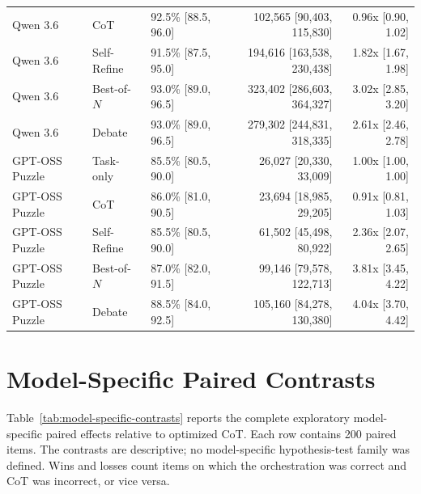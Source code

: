 \begin{table}[H]
{\begin{tabular}{@{}lllrr@{}}
Qwen 3.6 & CoT & 92.5\% [88.5, 96.0] & 102,565 [90,403, 115,830] & 0.96x [0.90, 1.02] \\
Qwen 3.6 & Self-Refine & 91.5\% [87.5, 95.0] & 194,616 [163,538, 230,438] & 1.82x [1.67, 1.98] \\
Qwen 3.6 & Best-of-$N$ & 93.0\% [89.0, 96.5] & 323,402 [286,603, 364,327] & 3.02x [2.85, 3.20] \\
Qwen 3.6 & Debate & 93.0\% [89.0, 96.5] & 279,302 [244,831, 318,335] & 2.61x [2.46, 2.78] \\
GPT-OSS Puzzle & Task-only & 85.5\% [80.5, 90.0] & 26,027 [20,330, 33,009] & 1.00x [1.00, 1.00] \\
GPT-OSS Puzzle & CoT & 86.0\% [81.0, 90.5] & 23,694 [18,985, 29,205] & 0.91x [0.81, 1.03] \\
GPT-OSS Puzzle & Self-Refine & 85.5\% [80.5, 90.0] & 61,502 [45,498, 80,922] & 2.36x [2.07, 2.65] \\
GPT-OSS Puzzle & Best-of-$N$ & 87.0\% [82.0, 91.5] & 99,146 [79,578, 122,713] & 3.81x [3.45, 4.22] \\
GPT-OSS Puzzle & Debate & 88.5\% [84.0, 92.5] & 105,160 [84,278, 130,380] & 4.04x [3.70, 4.42] \\
\bottomrule
\end{tabular}}
\end{table}

\section{Model-Specific Paired Contrasts}

Table~\ref{tab:model-specific-contrasts} reports the complete exploratory model-specific paired effects relative to optimized CoT.
Each row contains 200 paired items.
The contrasts are descriptive; no model-specific hypothesis-test family was defined.
Wins and losses count items on which the orchestration was correct and CoT was incorrect, or vice versa.

